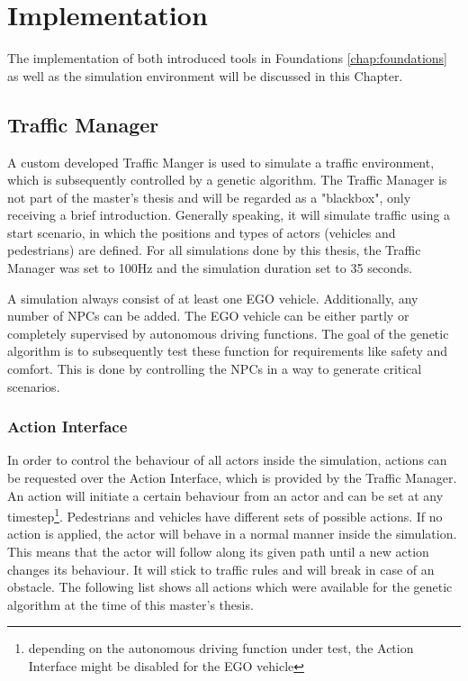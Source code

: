 \chapter{Implementation}
\label{chap:implementation}

The implementation of both introduced tools in Foundations \ref{chap:foundations} as well as the simulation environment will be discussed in this Chapter.

\section{Traffic Manager}
A custom developed Traffic Manger is used to simulate a traffic environment, which is subsequently controlled by a genetic algorithm. The Traffic Manager is not part of the master's thesis and will be regarded as a "blackbox", only receiving a brief introduction. Generally speaking, it will simulate traffic using a start scenario, in which the positions and types of actors (vehicles and pedestrians) are defined. For all simulations done by this thesis, the Traffic Manager was set to 100Hz and the simulation duration set to 35 seconds.

A simulation always consist of at least one EGO vehicle. Additionally, any number of NPCs can be added. The EGO vehicle can be either partly or completely supervised by autonomous driving functions. The goal of the genetic algorithm is to subsequently test these function for requirements like safety and comfort. This is done by controlling the NPCs in a way to generate critical scenarios.

\subsection{Action Interface}
\label{sect:implementation:action_interface}
In order to control the behaviour of all actors inside the simulation, actions can be requested over the Action Interface, which is provided by the Traffic Manager. An action will initiate a certain behaviour from an actor and can be set at any timestep\footnote{depending on the autonomous driving function under test, the Action Interface might be disabled for the EGO vehicle}. Pedestrians and vehicles have different sets of possible actions. If no action is applied, the actor will behave in a normal manner inside the simulation. This means that the actor will follow along its given path until a new action changes its behaviour. It will stick to traffic rules and will break in case of an obstacle. The following list shows all actions which were available for the genetic algorithm at the time of this master's thesis.

